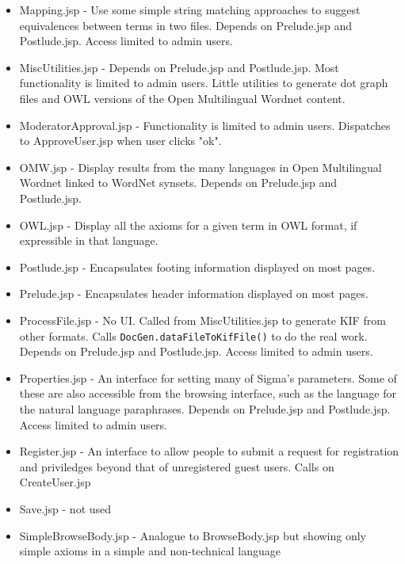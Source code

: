 \documentclass{book}
\begin{document}
\begin{itemize}
\item Mapping.jsp - Use some simple string matching approaches to suggest equivalences between terms
in two files.  Depends on Prelude.jsp and Postlude.jsp. Access limited to admin users.

\item MiscUtilities.jsp - Depends on Prelude.jsp and Postlude.jsp. Most functionality
is limited to admin users. Little utilities to generate dot graph files and OWL versions of
the Open Multilingual Wordnet content.

\item ModeratorApproval.jsp - Functionality is limited to admin users. Dispatches to ApproveUser.jsp
when user clicks "ok".

\item OMW.jsp - Display results from the many languages in Open Multilingual Wordnet linked to
WordNet synsets. Depends on Prelude.jsp and Postlude.jsp.

\item OWL.jsp - Display all the axioms for a given term in OWL format, if expressible in that
language.

\item Postlude.jsp - Encapsulates footing information displayed on most pages.

\item Prelude.jsp - Encapsulates header information displayed on most pages.

\item ProcessFile.jsp - No UI. Called from MiscUtilities.jsp to generate KIF from other
formats. Calls \texttt{DocGen.dataFileToKifFile()} to do the real work. Depends on Prelude.jsp and
Postlude.jsp. Access limited to admin users.

\item Properties.jsp - An interface for setting many of Sigma's parameters.  Some of these are
also accessible from the browsing interface, such as the language for the natural
language paraphrases. Depends on Prelude.jsp and Postlude.jsp. Access limited to admin users.

\item Register.jsp - An interface to allow people to submit a request for registration and
priviledges beyond that of unregistered guest users.  Calls on CreateUser.jsp

\item Save.jsp - not used

\item SimpleBrowseBody.jsp - Analogue to BrowseBody.jsp but showing only simple axioms in a simple
and non-technical language


\end{itemize}
\end{document}
